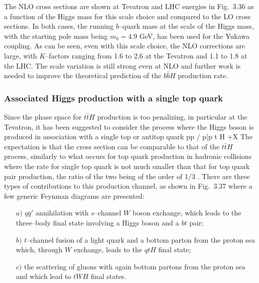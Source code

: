 The NLO cross sections are shown at Tevatron and LHC energies in Fig.~3.36 as a
function of the Higgs mass for this scale choice and compared to the LO cross
sections. In both cases, the running $b$--quark mass at the scale of the Higgs
mass, with the starting pole mass being $m_b =4.9$ GeV, has been used for 
the Yukawa coupling.  As can be seen, even with this scale choice, the
NLO corrections are large, with $K$--factors ranging from 1.6 to 2.6 at the
Tevatron and 1.1 to 1.8 at the LHC. The scale variation is still strong
even at NLO and further work is needed to improve the theoretical prediction of
the $b\bar b H$ production rate.

\subsubsection{Associated Higgs production with a single top quark} 

Since the phase space for $t\bar t H$ production is too penalizing, in
particular at the Tevatron, it has been suggested to consider the process where
the Higgs boson is produced in association with a single top or antitop quark
\cite{ppHt-3oldpapers,ppHt-Scott}
\beq
pp / p\bar p \to t H +X
\eeq
The expectation is that the  cross section can be comparable to that of the
$t\bar tH$ process, similarly to what occurs for top quark production 
in hadronic collisions where the rate for single top quark is not 
much smaller than that for top quark pair production, the ratio of the two 
being of the order of 1/3 \cite{ppSingleTop}. There are three types of 
contributions to this production channel, as shown in Fig.~3.37 where a few 
generic Feynman diagrams are presented: 

\begin{itemize}
\vspace*{-3mm}

\item[$a)$] $q \bar q'$ annihilation with $s$--channel $W$ boson exchange, 
which leads to the three--body final state involving a Higgs boson and a
$b t$ pair;  
\vspace*{-2mm}

\item[$b)$] $t$--channel fusion of a light quark and a bottom parton from the 
proton sea which, through $W$ exchange, leads to the $q tH$ final state; 
\vspace*{-2mm}

\item[$c)$] the scattering of gluons with again bottom 
partons from the proton sea and which lead to $tW H$ final states. 
\vspace*{-2mm}
\end{itemize}

